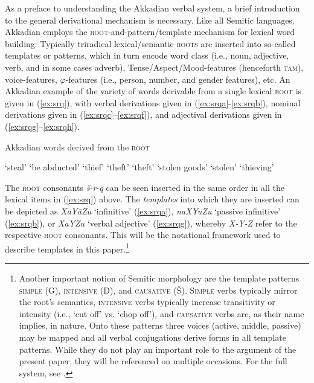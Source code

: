 \documentclass[output=paper,colorlinks,citecolor=brown]{langscibook}
\begin{document}
As a preface to understanding the Akkadian verbal system, a brief introduction to the general derivational mechanism is necessary. Like all Semitic languages, Akkadian employs the \textsc{root}-and-pattern/template mechanism for lexical word building: Typically triradical lexical/semantic \textsc{roots} are inserted into so-called templates or patterns, which in turn encode word class (i.e., noun, adjective, verb, and in some cases adverb), Tense/Aspect/Mood-features (henceforth \textsc{tam}), voice-features, $\varphi$-features (i.e., person, number, and gender features), etc. An Akkadian example of the variety of words derivable from a single lexical \textsc{root} is given in (\ref{ex:srq}), with verbal derivations given in (\ref{ex:srqa}-\ref{ex:srqb}), nominal derivations given in (\ref{ex:srqc}--\ref{ex:srqf}), and adjectival derivations given in (\ref{ex:srqg}--\ref{ex:srqh}).

\begin{exe}
    \ex Akkadian words derived from the \textsc{root} \label{ex:srq}
    \begin{xlist}
         `steal' \label{ex:srqa}
     `be abducted'\label{ex:srqb}
     `thief'\label{ex:srqc}
     `theft'\label{ex:srqd}
     `theft'\label{ex:srqe}
     `stolen goods'\label{ex:srqf}
     `stolen'\label{ex:srqg}
     `thieving'\label{ex:srqh}
    \end{xlist}
\end{exe}


 The \textsc{root} consonants \textit{š-r-q}  can be seen inserted in the same order in all the lexical items in (\ref{ex:srq}) above. The \textit{templates} into which they are inserted can be depicted as \textit{XaYāZu} `infinitive' (\ref{ex:srqa}), \textit{naXYuZu} `passive infinitive' (\ref{ex:srqb}), or \textit{XaYZu} `verbal adjective' (\ref{ex:srqg}), whereby \textit{X-Y-Z} refer to the respective \textsc{root} consonants. This will be the notational framework used to describe templates in this paper.\footnote{Another important notion of Semitic morphology are the template patterns \textsc{simple} (G), \textsc{intensive} (D), and \textsc{causative} (Š). \textsc{Simple} verbs typically mirror the root's semantics, \textsc{intensive} verbs typically increase transitivity or intensity (i.e., `cut off' vs. `chop off'), and \textsc{causative} verbs are, as their name implies,  in nature. Onto these patterns three voices (active, middle, passive) may be mapped and all verbal conjugations derive forms in all template patterns. While they do not play an important role to the argument of the present paper, they will be referenced on multiple occasions. For the full system, see \citet{kamil_phD}.}
\end{document}
